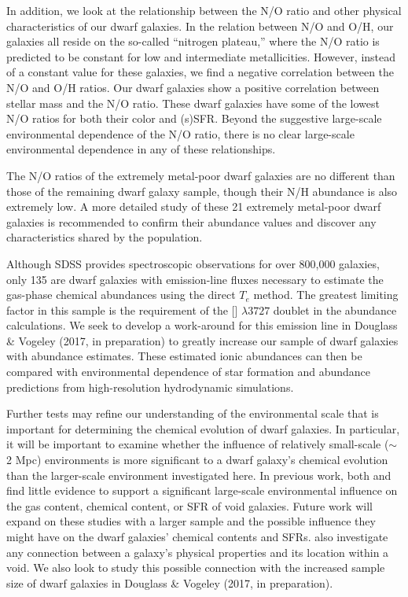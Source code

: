 In addition, we look at the relationship between the N/O ratio and other 
physical characteristics of our dwarf galaxies.  In the relation between N/O and 
O/H, our galaxies all reside on the so-called ``nitrogen plateau,'' where the 
N/O ratio is predicted to be constant for low and intermediate metallicities.  
However, instead of a constant value for these galaxies, we find a negative 
correlation between the N/O and O/H ratios.  Our dwarf galaxies show a positive 
correlation between stellar mass and the N/O ratio.  These dwarf galaxies have 
some of the lowest N/O ratios for both their color and (s)SFR.  Beyond the 
suggestive large-scale environmental dependence of the N/O ratio, there is no 
clear large-scale environmental dependence in any of these relationships.

The N/O ratios of the extremely metal-poor dwarf galaxies are no different than 
those of the remaining dwarf galaxy sample, though their N/H abundance is also 
extremely low.  A more detailed study of these 21 extremely metal-poor dwarf 
galaxies is recommended to confirm their abundance values and discover any 
characteristics shared by the population.

Although SDSS provides spectroscopic observations for over 800,000 galaxies, 
only 135 are dwarf galaxies with emission-line fluxes necessary to estimate the 
gas-phase chemical abundances using the direct $T_e$ method.  The greatest 
limiting factor in this sample is the requirement of the [] 
$\lambda 3727$ doublet in the abundance calculations.  We seek to develop a 
work-around for this emission line in Douglass \& Vogeley (2017, in preparation) 
to greatly increase our sample of dwarf galaxies with abundance estimates.  
These estimated ionic abundances can then be compared with environmental 
dependence of star formation and abundance predictions from high-resolution 
hydrodynamic simulations.

Further tests may refine our understanding of the environmental scale that is 
important for determining the chemical evolution of dwarf galaxies.  In 
particular, it will be important to examine whether the influence of relatively 
small-scale ($\sim$2 Mpc) environments is more significant to a dwarf galaxy's 
chemical evolution than the larger-scale environment investigated here.  In 
previous work, both \cite{Kreckel15} and \cite{Beygu17} find little evidence to 
support a significant large-scale environmental influence on the gas content, 
chemical content, or SFR of void galaxies.  Future work will expand on these 
studies with a larger sample and the possible influence they might have on the 
dwarf galaxies' chemical contents and SFRs.  \cite{Beygu17} also investigate any 
connection between a galaxy's physical properties and its location within a 
void.  We also look to study this possible connection with the increased sample 
size of dwarf galaxies in Douglass \& Vogeley (2017, in preparation).